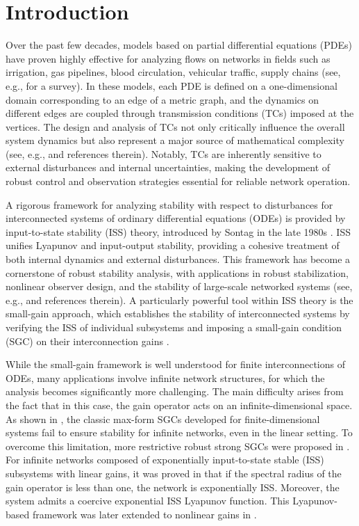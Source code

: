 \documentclass[onecolumn]{autart}
\numberwithin{equation}{section}
\begin{document}

 \section{Introduction}
    Over the past few decades, models based on partial differential equations (PDEs) have proven highly effective for analyzing flows on networks in {fields such as} irrigation, gas pipelines, blood circulation, vehicular traffic, supply chains (see, e.g., \cite{BCGHP} for a survey). In these models, each PDE is defined on a one-dimensional domain corresponding to an edge of a metric graph, and the dynamics on different edges are coupled through transmission conditions (TCs) imposed at the vertices. The design and analysis of TCs not only critically influence the overall system dynamics but also represent a major source of mathematical complexity (see, e.g., \cite{BRT,BCGHP,YGS,DZ,Dorn,HLS} and references therein). Notably, TCs are inherently sensitive to external disturbances and internal uncertainties, making the development of robust control and observation strategies essential for reliable network operation.

    A rigorous framework for analyzing stability with respect to disturbances for interconnected systems of ordinary differential equations (ODEs) is provided by input-to-state stability (ISS) theory, introduced by Sontag in the late 1980s \cite{Sontag}. ISS unifies Lyapunov and input-output stability, providing a cohesive treatment of both internal dynamics and external disturbances. This framework has become a cornerstone of robust stability analysis, with applications in robust stabilization, nonlinear observer design, and the stability of large-scale networked systems (see, e.g., \cite{KKK,Sontag1} and references therein). A particularly powerful tool within ISS theory is the small-gain approach, which establishes the stability of interconnected systems by verifying the ISS of individual subsystems and imposing a small-gain condition (SGC) on their interconnection gains \cite{DRW1,JTP}.

   While the small-gain framework is well understood for finite interconnections of ODEs, many applications involve infinite network structures, {for which} the analysis becomes significantly more challenging. The main difficulty arises from the fact that {in this case,} the gain operator acts on an infinite-dimensional space. As shown in \cite{DMSW}, the classic max-form SGCs developed for finite-dimensional systems \cite{DRW1} fail to ensure stability for infinite networks, even in the linear setting. To overcome this limitation, more restrictive robust strong SGCs were proposed in \cite{DMSW,DP}. For infinite networks composed of exponentially input-to-state stable (ISS) subsystems with linear gains, it was proved  in \cite{KMSNZ} that if the spectral radius of the gain operator is less than one, the network is exponentially ISS. Moreover, the system admits a coercive exponential ISS Lyapunov function. This Lyapunov-based framework was later extended to nonlinear gains in \cite{KMZ}.
	
\end{document}
